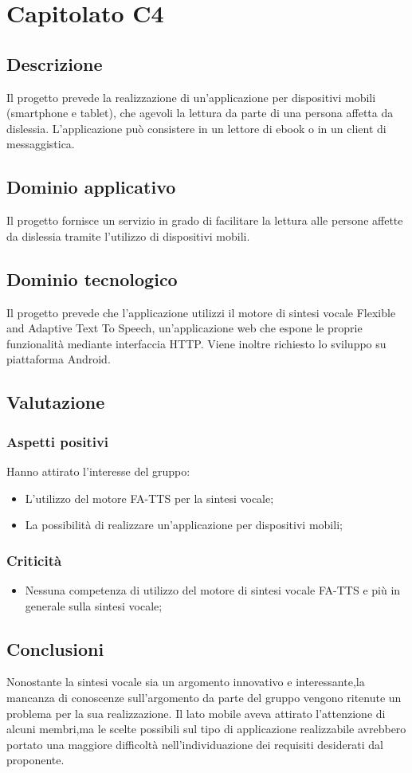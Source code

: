 \section {Capitolato C4}
	\subsection {Descrizione}
	Il progetto prevede la realizzazione di un'applicazione per dispositivi mobili (smartphone e tablet), che agevoli la
lettura da parte di una persona affetta da dislessia.  L'applicazione può consistere in un lettore di ebook o in un
client di messaggistica.
	\subsection {Dominio applicativo}
	Il progetto fornisce un servizio in grado di facilitare la lettura alle persone affette da dislessia tramite l'utilizzo di dispositivi mobili. 
	\subsection {Dominio tecnologico}
Il progetto prevede che l'applicazione utilizzi il motore di sintesi vocale Flexible and Adaptive Text To Speech, un'applicazione web che
espone le proprie funzionalità mediante interfaccia HTTP. Viene inoltre richiesto lo sviluppo su piattaforma Android.
	\subsection {Valutazione}
			\subsubsection {Aspetti positivi}
			Hanno attirato l'interesse del gruppo:
				\begin {itemize}
				  \item L'utilizzo del motore FA-TTS per la sintesi vocale;
				  \item La possibilità di realizzare un'applicazione per dispositivi mobili;			
				\end {itemize}
			\subsubsection {Criticità}
				\begin {itemize}
					\item Nessuna competenza di utilizzo del motore di sintesi vocale FA-TTS e più in generale sulla sintesi vocale;
				\end {itemize}
	\subsection {Conclusioni}
		Nonostante la sintesi vocale sia un argomento innovativo e interessante,la mancanza di conoscenze sull'argomento da parte del gruppo vengono ritenute un problema per la sua realizzazione. Il lato mobile aveva attirato l'attenzione di alcuni membri,ma le scelte possibili sul tipo di applicazione realizzabile avrebbero portato una maggiore difficoltà nell'individuazione dei requisiti desiderati dal proponente.